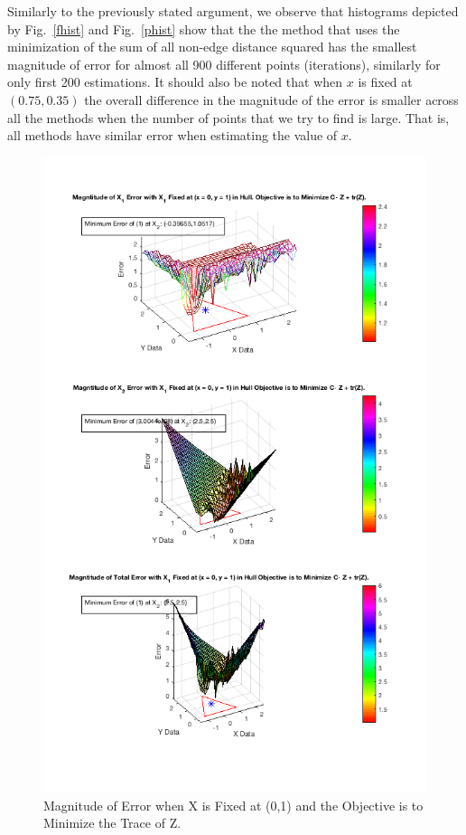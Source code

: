 \documentclass[answers]{exam}
\begin{document}
    
     Similarly to the previously stated argument, we observe that histograms depicted by Fig.~\ref{fhist} and Fig.~\ref{phist} show that the the method that uses the minimization of the sum of all non-edge distance squared has the smallest magnitude of error for almost all 900 different points (iterations), similarly for only first 200 estimations. It should also be noted that when $x$ is fixed at $(0.75, 0.35)$ the overall difference in the magnitude of the error is smaller across all the methods when the number of points that we try to find is large. That is, all methods have similar error when estimating the value of $x$. 
    
    
        \begin{figure}[H]
    \centering
    
        \caption{Magnitude of Error when X is Fixed at (0,1) and the Objective is to Minimize the Trace of Z.}
    \includegraphics[scale=.7]{Problem8f1.png}
    \end{figure} 
    
\end{document}
